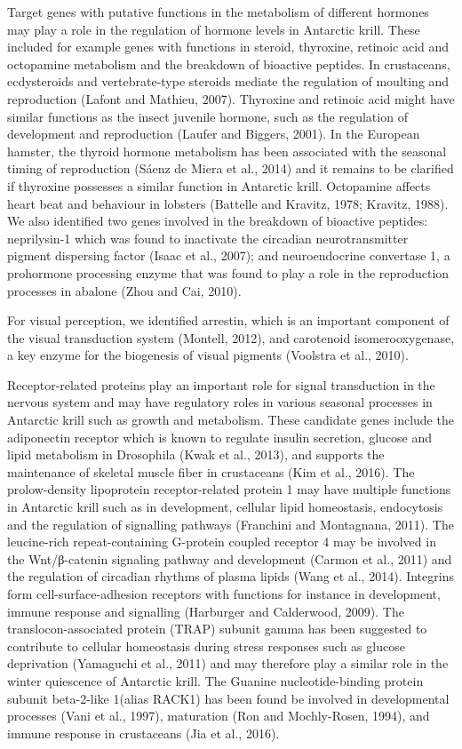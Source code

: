 Target genes with putative functions in the metabolism of different hormones
may play a role in the regulation of hormone levels in Antarctic krill. These
included for example genes with functions in steroid, thyroxine, retinoic acid
and octopamine metabolism and the breakdown of bioactive peptides. In
crustaceans, ecdysteroids and vertebrate-type steroids mediate the regulation
of moulting and reproduction (Lafont and Mathieu, 2007). Thyroxine and retinoic
acid might have similar functions as the insect juvenile hormone, such as the
regulation of development and reproduction (Laufer and Biggers, 2001). In the
European hamster, the thyroid hormone metabolism has been associated with the
seasonal timing of reproduction (Sáenz de Miera et al., 2014) and it remains to
be clarified if thyroxine possesses a similar function in Antarctic krill.
Octopamine affects heart beat and behaviour in lobsters (Battelle and Kravitz,
1978; Kravitz, 1988). We also identified two genes involved in the breakdown of
bioactive peptides: neprilysin-1 which was found to inactivate the circadian
neurotransmitter pigment dispersing factor (Isaac et al., 2007); and
neuroendocrine convertase 1, a prohormone processing enzyme that was found to
play a role in the reproduction processes in abalone (Zhou and Cai, 2010).  

For visual perception, we identified arrestin, which is an important component
of the visual transduction system (Montell, 2012), and carotenoid
isomerooxygenase, a key enzyme for the biogenesis of visual pigments (Voolstra
et al., 2010).

Receptor-related proteins play an important role for signal transduction in the
nervous system and may have regulatory roles in various seasonal processes in
Antarctic krill such as growth and metabolism. These candidate genes include
the adiponectin receptor which is known to regulate insulin secretion, glucose
and lipid metabolism in Drosophila (Kwak et al., 2013), and supports the
maintenance of skeletal muscle fiber in crustaceans (Kim et al., 2016). The
prolow-density lipoprotein receptor-related protein 1 may have multiple
functions in Antarctic krill such as in development, cellular lipid
homeostasis, endocytosis and the regulation of signalling pathways (Franchini
and Montagnana, 2011). The leucine-rich repeat-containing G-protein coupled
receptor 4 may be involved in the Wnt/β-catenin signaling pathway and
development (Carmon et al., 2011) and the regulation of circadian rhythms of
plasma lipids (Wang et al., 2014). Integrins form cell-surface-adhesion
receptors with functions for instance in development, immune response and
signalling (Harburger and Calderwood, 2009). The translocon-associated protein
(TRAP) subunit gamma has been suggested to contribute to cellular homeostasis
during stress responses such as glucose deprivation (Yamaguchi et al., 2011)
and may therefore play a similar role in the winter quiescence of Antarctic
krill. The Guanine nucleotide-binding protein subunit beta-2-like 1(alias
RACK1) has been found be involved in developmental processes (Vani et al.,
1997), maturation (Ron and Mochly-Rosen, 1994), and immune response in
crustaceans (Jia et al., 2016).

